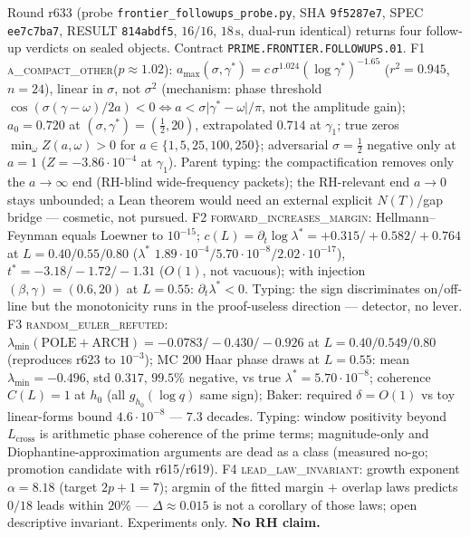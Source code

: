 \documentclass[11pt]{article}
\theoremstyle{definition}
\theoremstyle{remark}
\begin{document}
\noindent Round r633 (probe \texttt{frontier\_followups\_probe.py},
SHA \texttt{9f5287e7}, SPEC \texttt{ee7c7ba7}, RESULT
\texttt{814abdf5}, $16/16$, $18\,\mathrm{s}$, dual-run
identical) returns four follow-up verdicts on sealed objects.
Contract \texttt{PRIME.FRONTIER.FOLLOWUPS.01}.
F1 \textsc{a\_compact\_other}($p\approx 1.02$):
$a_{\max}(\sigma,\gamma^*)=c\,\sigma^{1.024}(\log\gamma^*)^{-1.65}$
($r^2=0.945$, $n=24$), linear in $\sigma$, not $\sigma^2$
(mechanism: phase threshold
$\cos(\sigma(\gamma-\omega)/2a)<0\Leftrightarrow
a<\sigma\lvert\gamma^*-\omega\rvert/\pi$, not the amplitude
gain); $a_0=0.720$ at $(\sigma,\gamma^*)=(\tfrac12,20)$,
extrapolated $0.714$ at $\gamma_1$; true zeros
$\min_\omega Z(a,\omega)>0$ for
$a\in\{1,5,25,100,250\}$; adversarial $\sigma=\tfrac12$
negative only at $a=1$ ($Z=-3.86\cdot10^{-4}$ at $\gamma_1$).
Parent typing: the compactification removes only the
$a\to\infty$ end (RH-blind wide-frequency packets); the
RH-relevant end $a\to 0$ stays unbounded; a Lean theorem
would need an external explicit $N(T)$/gap bridge ---
cosmetic, not pursued.
F2 \textsc{forward\_increases\_margin}: Hellmann--Feynman
equals Loewner to $10^{-15}$;
$c(L)=\partial_t\log\lambda^*=+0.315/+0.582/+0.764$ at
$L=0.40/0.55/0.80$ ($\lambda^*$
$1.89\cdot10^{-4}/5.70\cdot10^{-8}/2.02\cdot10^{-17}$),
$t^*=-3.18/-1.72/-1.31$ ($O(1)$, not vacuous); with
injection $(\beta,\gamma)=(0.6,20)$ at $L=0.55$:
$\partial_t\lambda^*<0$.  Typing: the sign discriminates
on/off-line but the monotonicity runs in the proof-useless
direction --- detector, no lever.
F3 \textsc{random\_euler\_refuted}:
$\lambda_{\min}(\mathrm{POLE}+\mathrm{ARCH})=-0.0783/-0.430/-0.926$
at $L=0.40/0.549/0.80$ (reproduces r623 to $10^{-3}$);
MC $200$ Haar phase draws at $L=0.55$: mean
$\lambda_{\min}=-0.496$, std $0.317$, $99.5\%$ negative, vs
true $\lambda^*=5.70\cdot10^{-8}$; coherence $C(L)=1$ at
$h_0$ (all $g_{h_0}(\log q)$ same sign); Baker: required
$\delta=O(1)$ vs toy linear-forms bound $4.6\cdot10^{-8}$ ---
$7.3$ decades.  Typing: window positivity beyond
$L_{\mathrm{cross}}$ is arithmetic phase coherence of the
prime terms; magnitude-only and Diophantine-approximation
arguments are dead as a class (measured no-go; promotion
candidate with r615/r619).
F4 \textsc{lead\_law\_invariant}: growth exponent
$\alpha=8.18$ (target $2p+1=7$); argmin of the fitted
margin $+$ overlap laws predicts $0/18$ leads within
$20\%$ --- $\Delta\approx 0.015$ is not a corollary of
those laws; open descriptive invariant.
Experiments only.  \textbf{No RH claim.}

\end{document}
